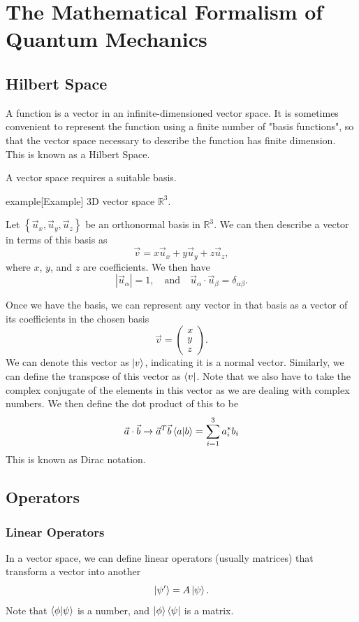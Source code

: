 \documentclass{article}
\begin{document}
\section{The Mathematical Formalism of Quantum Mechanics}
\subsection{Hilbert Space}
A function is a vector in an infinite-dimensioned vector space. It is sometimes convenient to represent the function using a finite number of "basis functions", so that the vector space necessary to describe the function has finite dimension. This is known as a Hilbert Space.

A vector space requires a suitable basis.
\begin{callout}{example}[Example]
\label{example:s1-e1}
3D vector space $\mathbb{R}^3$.

Let $\left\{ \vec{u}_x,\vec{u}_y,\vec{u}_z \right\}$ be an orthonormal basis in $\mathbb{R}^3$. We can then describe a vector in terms of this basis as
\[
    \vec{v}=x\vec{u}_x+y\vec{u}_y+z\vec{u}_z,
\]
where $x$, $y$, and $z$ are coefficients. We then have
\[
    |\vec{u}_\alpha |=1,\quad \text{and}\quad\vec{u}_\alpha \cdot\vec{u}_\beta =\delta _{\alpha\beta }.
\]
\end{callout}

Once we have the basis, we can represent any vector in that basis as a vector of its coefficients in the chosen basis
\[
    \vec{v}=\begin{pmatrix}
        x \\ y \\ z
    \end{pmatrix}.
\]
We can denote this vector as $\ket{v}$, indicating it is a normal vector. Similarly, we can define the transpose of this vector as $\bra{v}$. Note that we also have to take the complex conjugate of the elements in this vector as we are dealing with complex numbers. We then define the dot product of this to be
\[
    \vec{a}\cdot\vec{b}\to \vec{a}^T\vec{b}\braket{a}{b}=\sum_{i=1}^{3} a_i^*b_i
\]
This is known as Dirac notation.

\subsection{Operators}
\subsubsection{Linear Operators}
In a vector space, we can define linear operators (usually matrices) that transform a vector into another
\[
    \ket{\psi '}=A \ket{\psi }.
\]
Note that $\braket{\phi }{\psi }$ is a number, and $\ket{\phi }\bra{\psi }$ is a matrix.
\end{document}
